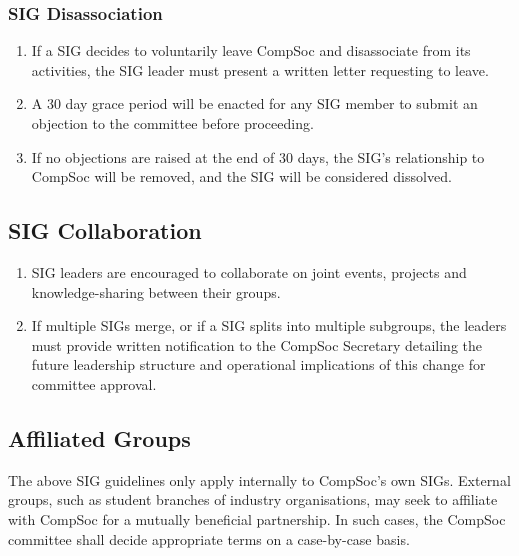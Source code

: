 \subsubsection{SIG Disassociation}
\begin{enumerate}
    \item If a SIG decides to voluntarily leave CompSoc and disassociate from its activities, the SIG leader must present a written letter requesting to leave.
    \item A 30 day grace period will be enacted for any SIG member to submit an objection to the committee before proceeding.
    \item If no objections are raised at the end of 30 days, the SIG's relationship to CompSoc will be removed, and the SIG will be considered dissolved.
\end{enumerate}

\subsection{SIG Collaboration}
\begin{enumerate}
    \item SIG leaders are encouraged to collaborate on joint events, projects and knowledge-sharing between their groups.
    \item If multiple SIGs merge, or if a SIG splits into multiple subgroups, the leaders must provide written notification to the CompSoc Secretary detailing the future leadership structure and operational implications of this change for committee approval.
\end{enumerate}

\subsection{Affiliated Groups}

The above SIG guidelines only apply internally to CompSoc's own SIGs. External groups, such as student branches of industry organisations, may seek to affiliate with CompSoc for a mutually beneficial partnership. In such cases, the CompSoc committee shall decide appropriate terms on a case-by-case basis. 
